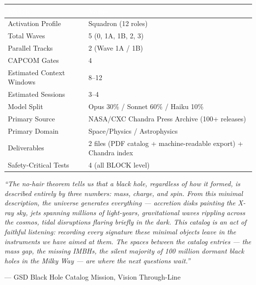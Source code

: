\documentclass[11pt,letterpaper]{article}
\newcommand{\tableheader}[1]{\textbf{\sffamily\textcolor{white}{#1}}}
\begin{document}
\begin{center}
\begin{tabularx}{\textwidth}{L{5cm}X}
\toprule
{}
\tableheader{Metric} & \tableheader{Value} \\
\midrule
Activation Profile & Squadron (12 roles) \\
Total Waves & 5 (0, 1A, 1B, 2, 3) \\
Parallel Tracks & 2 (Wave 1A / 1B) \\
CAPCOM Gates & 4 \\
Estimated Context Windows & 8--12 \\
Estimated Sessions & 3--4 \\
Model Split & Opus 30\% / Sonnet 60\% / Haiku 10\% \\
Primary Source & NASA/CXC Chandra Press Archive (100+ releases) \\
Primary Domain & Space/Physics / Astrophysics \\
Deliverables & 2 files (PDF catalog + machine-readable export) + Chandra index \\
Safety-Critical Tests & 4 (all BLOCK level) \\
\bottomrule
\end{tabularx}
\end{center}

\vspace{2em}

\begin{quotebox}
\textit{``The no-hair theorem tells us that a black hole, regardless of how it formed, is described entirely by three numbers: mass, charge, and spin. From this minimal description, the universe generates everything --- accretion disks painting the X-ray sky, jets spanning millions of light-years, gravitational waves rippling across the cosmos, tidal disruptions flaring briefly in the dark. This catalog is an act of faithful listening: recording every signature these minimal objects leave in the instruments we have aimed at them. The spaces between the catalog entries --- the mass gap, the missing IMBHs, the silent majority of 100 million dormant black holes in the Milky Way --- are where the next questions wait.''}

\vspace{0.5em}
\hfill --- GSD Black Hole Catalog Mission, Vision Through-Line
\end{quotebox}
\end{document}
